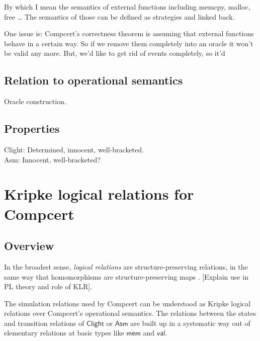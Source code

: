 \documentclass[acmsmall,anonymous,review]{acmart}
\newcommand{\kw}[1]{\ensuremath{ \textsf{#1} }}
\begin{document}
By which I mean the semantics of external functions
including memcpy, malloc, free \ldots
The semantics of those can be defined as strategies
and linked back.



One issue is:
Compcert's correctness theorem is
assuming that external functions behave in a certain way.
So if we remove them completely into an oracle
it won't be valid any more.
But,
we'd like to get rid of events completely,
so it'd 


\subsection{Relation to operational semantics} %

Oracle construction.


\subsection{Properties} %

Clight: Determined, innocent, well-bracketed. \\
Asm: Innocent, well-bracketed?



\section{Kripke logical relations for Compcert} %


\subsection{Overview} %

In the broadest sense,
\emph{logical relations} are structure-preserving relations,
in the same way that homomorphisms are structure-preserving maps
\citep{lrp}.
[Explain use in PL theory and role of KLR].

The simulation relations used by Compcert can be understood
as Kripke logical relations over
Compcert's operational semantics.
The relations between
the states and transition relations of \kw{Clight} or \kw{Asm}
are built up in a systematic way out of elementary relations
at basic types like \kw{mem} and \kw{val}.
\end{document}
